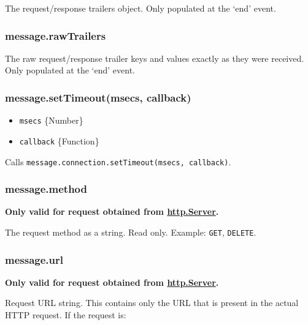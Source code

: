 The request/response trailers object. Only populated at the `end' event.

\subsubsection{message.rawTrailers}\label{message.rawtrailers}

The raw request/response trailer keys and values exactly as they were
received. Only populated at the `end' event.

\subsubsection{message.setTimeout(msecs,
callback)}\label{message.settimeoutmsecs-callback}

\begin{itemize}
\itemsep1pt\parskip0pt
\item
  \texttt{msecs} \{Number\}
\item
  \texttt{callback} \{Function\}
\end{itemize}

Calls \texttt{message.connection.setTimeout(msecs,\ callback)}.

\subsubsection{message.method}\label{message.method}

\textbf{Only valid for request obtained from
\hyperref[httpux5fclassux5fhttpux5fserver]{http.Server}.}

The request method as a string. Read only. Example:
\texttt{\textquotesingle{}GET\textquotesingle{}},
\texttt{\textquotesingle{}DELETE\textquotesingle{}}.

\subsubsection{message.url}\label{message.url}

\textbf{Only valid for request obtained from
\hyperref[httpux5fclassux5fhttpux5fserver]{http.Server}.}

Request URL string. This contains only the URL that is present in the
actual HTTP request. If the request is:

\begin{Shaded}
\begin{Highlighting}[]
\end{Highlighting}
\end{Shaded}

